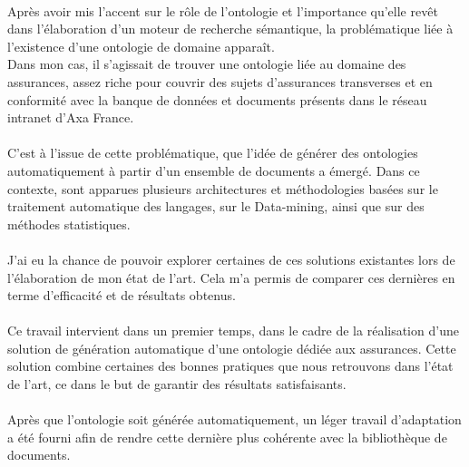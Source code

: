 \documentclass[12pt, a4paper, oneside]{book}
\begin{document}
\paragraph{}

Après avoir mis l’accent sur le rôle de l’ontologie et l’importance qu’elle revêt dans l'élaboration d'un moteur de recherche sémantique, la problématique liée à l'existence d'une ontologie de domaine apparaît.\\
Dans mon cas, il s'agissait de trouver une ontologie liée au domaine des assurances, assez riche pour couvrir des sujets d'assurances transverses et en conformité avec la banque de données et documents présents dans le réseau intranet d'Axa France.

\paragraph{}

C'est à l'issue de cette problématique, que l'idée de générer des ontologies automatiquement à partir d'un ensemble de documents a émergé. Dans ce contexte, sont apparues plusieurs architectures et méthodologies basées sur le traitement automatique des langages, sur le Data-mining, ainsi que sur des méthodes statistiques.\\

\paragraph{}

J'ai eu la chance de pouvoir explorer certaines de ces solutions existantes lors de l'élaboration de mon état de l'art. Cela m'a permis de comparer ces dernières en terme d'efficacité et de résultats obtenus.

\paragraph{}

Ce travail intervient dans un premier temps, dans le cadre de la réalisation d'une solution de génération automatique d'une ontologie dédiée aux assurances. Cette solution combine certaines des bonnes pratiques que nous retrouvons dans l'état de l'art, ce dans le but de garantir des résultats satisfaisants.

\paragraph{}
Après que l'ontologie soit générée automatiquement, un léger travail d'adaptation a été fourni afin de rendre cette dernière plus cohérente avec la bibliothèque de documents. 
\end{document}
